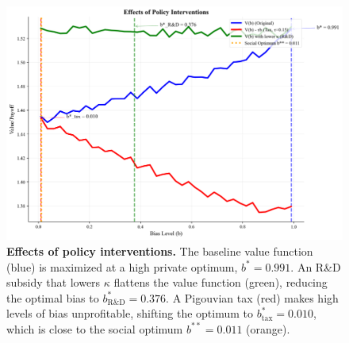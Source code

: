 \begin{figure}[H]
    \centering
    \includegraphics[width=1\textwidth]{../figures/figure_2_policy_interventions.png}
    \caption[Effects of policy interventions]{\textbf{Effects of policy interventions.} The baseline value function (blue) is maximized at a high private optimum, $b^*=0.991$. An R\&D subsidy that lowers $\kappa$ flattens the value function (green), reducing the optimal bias to $b^*_{\text{R\&D}}=0.376$. A Pigouvian tax (red) makes high levels of bias unprofitable, shifting the optimum to $b^*_{\text{tax}}=0.010$, which is close to the social optimum $b^{**}=0.011$ (orange).}
    \label{fig:policy}
\end{figure}